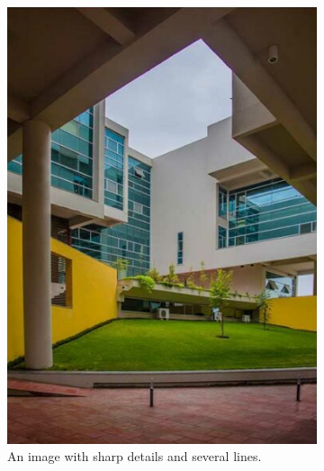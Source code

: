 \documentclass[addpoints]{exam}
\begin{document}
  \begin{figure}
    \centering
    \begin{subfigure}{.31\textwidth}
      \includegraphics[width=\textwidth]{campus}
      \caption{An image with sharp details and several lines.}\label{fig:mask-orig}
    \end{subfigure}
    \begin{subfigure}[c]{.31\textwidth}

\end{subfigure}
\end{figure}
\end{document}
